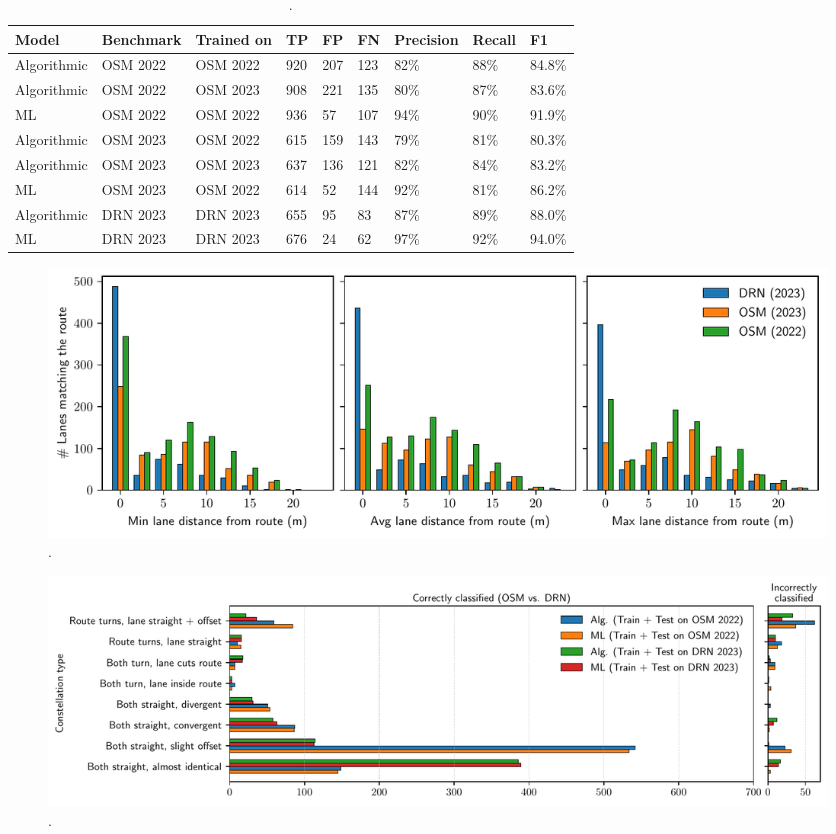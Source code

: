\begin{table}[h]
\caption{.}
\begin{tabular}{@{}lllllllll@{}}
\toprule
  \textbf{Model} & \textbf{Benchmark} & \textbf{Trained on} & \textbf{TP} & \textbf{FP} & \textbf{FN} & \textbf{Precision} & \textbf{Recall} & \textbf{F1} \\
  \midrule
  Algorithmic & OSM 2022 & OSM 2022 & 920 & 207 & 123 & 82\% & 88\% & 84.8\% \\
  Algorithmic & OSM 2022 & OSM 2023 & 908 & 221 & 135 & 80\% & 87\% & 83.6\% \\
  ML          & OSM 2022 & OSM 2022 & 936 & 57 & 107 & 94\% & 90\% & 91.9\% \\
  \midrule
  Algorithmic & OSM 2023 & OSM 2022 & 615 & 159 & 143 & 79\% & 81\% & 80.3\% \\
  Algorithmic & OSM 2023 & OSM 2023 & 637 & 136 & 121 & 82\% & 84\% & 83.2\% \\
  ML          & OSM 2023 & OSM 2022 & 614 & 52 & 144 & 92\% & 81\% & 86.2\% \\
  \midrule
  Algorithmic & DRN 2023 & DRN 2023 & 655 & 95 & 83 & 87\% & 89\% & 88.0\% \\
  ML          & DRN 2023 & DRN 2023 & 676 & 24 & 62 & 97\% & 92\% & 94.0\% \\
\bottomrule
\end{tabular}
\label{tab:model-scores-drn}
\end{table}

\begin{figure}[htbp]
\centering 
\includegraphics[width=\linewidth]{images/routing-lane-alignment.pdf}
\caption{.}
\label{fig:}
\end{figure}

\begin{figure}[htbp]
\centering 
\includegraphics[width=\linewidth]{images/matching-constellations-osm-vs-drn.pdf}
\caption{.}
\label{fig:}
\end{figure}

